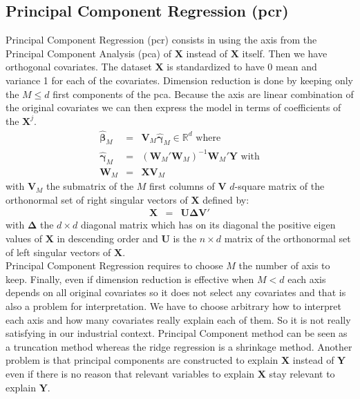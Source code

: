 \documentclass[12pt,a4paper]{report}
\begin{document}
		\subsection{Principal Component Regression ({\sc pcr})}
	Principal Component Regression ({\sc pcr})\cite{jackson2005user} consists in using the axis from the Principal Component Analysis ({\sc pca}) of $\boldsymbol{X}$ instead of $\boldsymbol{X}$ itself. Then we have orthogonal covariates. The dataset $\boldsymbol{X}$ is standardized to have 0 mean and variance 1 for each of the covariates. Dimension reduction is done by keeping only the $M \leq d$ first components of the {\sc pca}. Because the axis are linear combination of the original covariates we can then express the model in terms of coefficients of the $\boldsymbol{X}^j$.\\
	\begin{eqnarray}
		\hat{\boldsymbol{\beta}}_M&=&\boldsymbol{V}_M\hat{\boldsymbol{\gamma}}_M \in \mathbb{R}^d \textrm{ where}  \nonumber \\
		\hat{\boldsymbol{\gamma}}_M&=&(\boldsymbol{W}_M'\boldsymbol{W}_M)^{-1}\boldsymbol{W}_M'\boldsymbol{Y} \textrm{ with} \nonumber  \\
		\boldsymbol{W}_M&=&\boldsymbol{X}\boldsymbol{V}_M \nonumber 
	\end{eqnarray}
	with $\boldsymbol{V}_M$ the submatrix of the $M$ first columns of $\boldsymbol{V}$ $d$-square matrix of the orthonormal set of right singular vectors of $\boldsymbol{X}$ defined by:
	\begin{eqnarray}
		\boldsymbol{X}&=&\boldsymbol{U}\boldsymbol{\Delta}\boldsymbol{V}' \nonumber 
	\end{eqnarray}
	with $\boldsymbol{\Delta}$ the $d\times d$ diagonal matrix which has on its diagonal the positive eigen values of $\boldsymbol{X}$ in descending order and $\boldsymbol{U}$ is the $n\times d$ matrix of the orthonormal set of left singular vectors of $\boldsymbol{X}$.\\
	
	Principal Component Regression requires to choose $M$ the number of axis to keep. Finally, even if dimension reduction is effective when $M<d$ each axis depends on all original covariates so it does not select any covariates and that is also a problem for interpretation. We have to choose arbitrary how to interpret each axis and how many covariates really explain each of them. So it is not really satisfying in our industrial context. Principal Component method can be seen as a truncation method whereas the ridge regression is a shrinkage method. Another problem is that principal components are constructed to explain $\boldsymbol{X}$ instead of $\boldsymbol{Y}$ even if there is no reason that relevant variables to explain $\boldsymbol{X}$ stay relevant to explain $\boldsymbol{Y}$. \\
\end{document}
